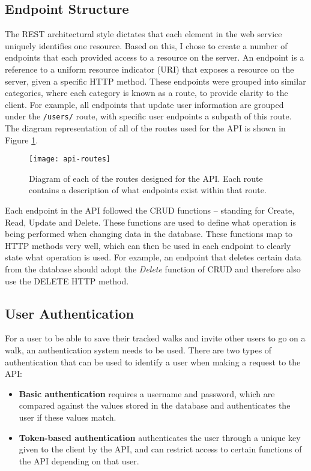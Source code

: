 \subsection{Endpoint Structure}

The REST architectural style dictates that each element in the web service uniquely identifies one resource. Based on this, I chose to create a number of endpoints that each provided access to a resource on the server. An endpoint is a reference to a uniform resource indicator (URI) that exposes a resource on the server, given a specific HTTP method. These endpoints were grouped into similar categories, where each category is known as a route, to provide clarity to the client. For example, all endpoints that update user information are grouped under the \texttt{/users/} route, with specific user endpoints a subpath of this route. The diagram representation of all of the routes used for the API is shown in Figure \ref{fig:api-routes}.

\begin{figure}[hbt]
  \centering
  \texttt{[image: api-routes]}
  \caption{Diagram of each of the routes designed for the API. Each route contains a description of what endpoints exist within that route.}
  \label{fig:api-routes}
\end{figure}

Each endpoint in the API followed the CRUD functions -- standing for Create, Read, Update and Delete. These functions are used to define what operation is being performed when changing data in the database. These functions map to HTTP methods very well, which can then be used in each endpoint to clearly state what operation is used. For example, an endpoint that deletes certain data from the database should adopt the \textit{Delete} function of CRUD and therefore also use the DELETE HTTP method.

\subsection{User Authentication}

For a user to be able to save their tracked walks and invite other users to go on a walk, an authentication system needs to be used. There are two types of authentication that can be used to identify a user when making a request to the API:

\begin{itemize}
  \item \textbf{Basic authentication} requires a username and password, which are compared against the values stored in the database and authenticates the user if these values match.

  \item \textbf{Token-based authentication} authenticates the user through a unique key given to the client by the API, and can restrict access to certain functions of the API depending on that user.
\end{itemize}

